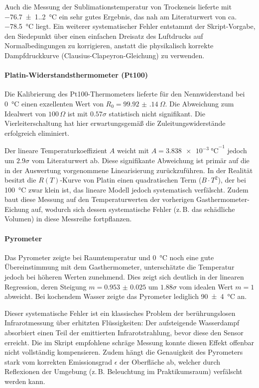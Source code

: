\documentclass[12pt,a4paper,titlepage]{scrartcl}
\numberwithin{equation}{section}
\numberwithin{table}{section}
\numberwithin{figure}{section}
\begin{document}
Auch die Messung der Sublimationstemperatur von Trockeneis lieferte mit \qty{-76.7(1.2)}{\degreeCelsius} ein sehr gutes Ergebnis, das nah am Literaturwert von ca. \qty{-78.5}{\degreeCelsius} liegt. Ein weiterer systematischer Fehler entstammt der Skript-Vorgabe, den Siedepunkt über einen einfachen Dreisatz des Luftdrucks auf Normalbedingungen zu korrigieren, anstatt die physikalisch korrekte Dampfdruckkurve (Clausius-Clapeyron-Gleichung) zu verwenden. 

\paragraph{Platin-Widerstandsthermometer (Pt100)}
Die Kalibrierung des Pt100-Thermometers lieferte für den Nennwiderstand bei \qty{0}{\degreeCelsius} einen exzellenten Wert von $R_0 = \qty{99.92(14)}{\Omega}$. Die Abweichung zum Idealwert von $100\,\si{\Omega}$ ist mit $0.57\sigma$ statistisch nicht signifikant. Die Vierleiterschaltung hat hier erwartungsgemäß die Zuleitungswiderstände erfolgreich eliminiert. 

Der lineare Temperaturkoeffizient $A$ weicht mit $A = \qty{3.838e-3}{\degreeCelsius}^{-1}$ jedoch um $2.9\sigma$ vom Literaturwert ab. Diese signifikante Abweichung ist primär auf die in der Auswertung vorgenommene Linearisierung zurückzuführen. In der Realität besitzt die $R(T)$-Kurve von Platin einen quadratischen Term ($B \cdot T^2$), der bei \qty{100}{\degreeCelsius} zwar klein ist, das lineare Modell jedoch systematisch verfälscht. Zudem baut diese Messung auf den Temperaturwerten der vorherigen Gasthermometer-Eichung auf, wodurch sich dessen systematische Fehler (z.\,B. das schädliche Volumen) in diese Messreihe fortpflanzen.

\paragraph{Pyrometer}
Das Pyrometer zeigte bei Raumtemperatur und \qty{0}{\degreeCelsius} noch eine gute Übereinstimmung mit dem Gasthermometer, unterschätzte die Temperatur jedoch bei höheren Werten zunehmend. Dies zeigt sich deutlich in der linearen Regression, deren Steigung $m = \num{0.953(25)}$ um $1.88\sigma$ vom idealen Wert $m=1$ abweicht. Bei kochendem Wasser zeigte das Pyrometer lediglich \qty{90(4)}{\degreeCelsius} an. 

Dieser systematische Fehler ist ein klassisches Problem der berührungslosen Infrarotmessung über erhitzten Flüssigkeiten: Der aufsteigende Wasserdampf absorbiert einen Teil der emittierten Infrarotstrahlung, bevor diese den Sensor erreicht. Die im Skript empfohlene schräge Messung konnte diesen Effekt offenbar nicht vollständig kompensieren. Zudem hängt die Genauigkeit des Pyrometers stark vom korrekten Emissionsgrad $\epsilon$ der Oberfläche ab, welcher durch Reflexionen der Umgebung (z.\,B. Beleuchtung im Praktikumsraum) verfälscht werden kann.
\end{document}
